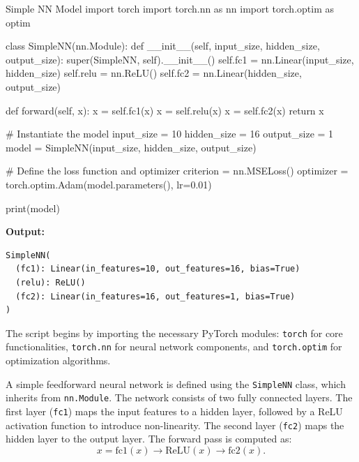\begin{codeonly}{Simple NN Model}
import torch
import torch.nn as nn
import torch.optim as optim

class SimpleNN(nn.Module):
    def __init__(self, input_size, hidden_size, output_size):
        super(SimpleNN, self).__init__()
        self.fc1 = nn.Linear(input_size, hidden_size)
        self.relu = nn.ReLU()
        self.fc2 = nn.Linear(hidden_size, output_size)
        
    def forward(self, x):
        x = self.fc1(x)
        x = self.relu(x)
        x = self.fc2(x)
        return x

# Instantiate the model
input_size = 10
hidden_size = 16
output_size = 1
model = SimpleNN(input_size, hidden_size, output_size)

# Define the loss function and optimizer
criterion = nn.MSELoss()
optimizer = torch.optim.Adam(model.parameters(), lr=0.01)

print(model)
\end{codeonly}


\textbf{Output:}
\begin{lstlisting}
SimpleNN(
  (fc1): Linear(in_features=10, out_features=16, bias=True)
  (relu): ReLU()
  (fc2): Linear(in_features=16, out_features=1, bias=True)
)
\end{lstlisting}

%

The script begins by importing the necessary PyTorch modules: \texttt{torch} for core functionalities, \texttt{torch.nn} for neural network components, and \texttt{torch.optim} for optimization algorithms.

A simple feedforward neural network is defined using the \texttt{SimpleNN} class, which inherits from \texttt{nn.Module}. The network consists of two fully connected layers. The first layer (\texttt{fc1}) maps the input features to a hidden layer, followed by a ReLU activation function to introduce non-linearity. The second layer (\texttt{fc2}) maps the hidden layer to the output layer. The forward pass is computed as:
\begin{equation}
    x = \text{fc1}(x) \rightarrow \text{ReLU}(x) \rightarrow \text{fc2}(x).
\end{equation}

